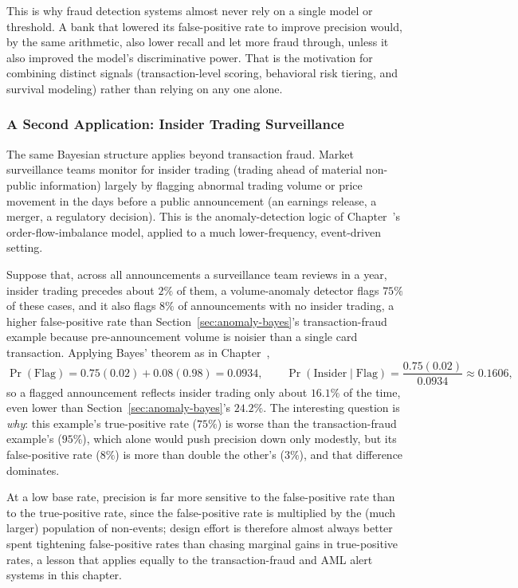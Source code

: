 \documentclass[../ai_in_finance]{subfiles}
\begin{document}
This is why fraud detection systems almost never rely on a single model or threshold. A bank that lowered its false-positive rate to improve precision would, by the same arithmetic, also lower recall and let more
fraud through, unless it also improved the model's discriminative power. That is the motivation for combining
distinct signals (transaction-level scoring, behavioral risk tiering, and survival modeling) rather
than relying on any one alone.

\subsubsection*{A Second Application: Insider Trading Surveillance}

The same Bayesian structure applies beyond transaction fraud. Market surveillance teams monitor for insider trading (trading ahead of material
non-public information) largely by flagging abnormal trading volume or price movement in the days before a public announcement
(an earnings release, a merger, a regulatory decision). This is the anomaly-detection logic of Chapter~'s order-flow-imbalance model, applied to a much lower-frequency, event-driven setting.

Suppose that, across all announcements a surveillance team reviews
in a year, insider trading precedes about $2\%$ of them, a volume-anomaly detector flags $75\%$ of these cases, and
it also flags $8\%$ of announcements with no insider trading, a higher false-positive rate than Section~\ref{sec:anomaly-bayes}'s
transaction-fraud example because pre-announcement volume is noisier than a single card transaction. Applying Bayes'
theorem as in Chapter~,
\begin{equation*}
\Pr(\text{Flag}) = 0.75(0.02) + 0.08(0.98) = 0.0934, \qquad \Pr(\text{Insider}\mid\text{Flag}) = \frac{0.75(0.02)}{0.0934} \approx 0.1606,
\end{equation*}
so a flagged announcement reflects insider trading only about $16.1\%$ of the time, even lower than Section~\ref{sec:anomaly-bayes}'s $24.2\%$. The interesting question is \emph{why}: this example's true-positive rate ($75\%$) is worse than the
transaction-fraud example's ($95\%$), which alone would push precision down only modestly, but its false-positive rate ($8\%$) is more
than double the other's ($3\%$), and that difference dominates.

At a low base rate, precision is far
more sensitive to the false-positive rate than to the true-positive rate, since the false-positive rate is multiplied by the (much larger) population
of non-events; design effort is therefore almost always better spent tightening false-positive rates than chasing marginal
gains in true-positive rates, a lesson that applies equally to the transaction-fraud and AML alert systems in this
chapter.
\end{document}
